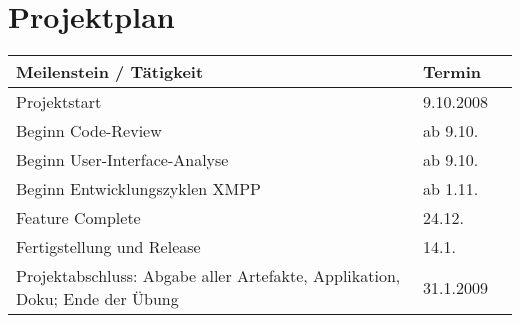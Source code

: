 

\section{Projektplan}
\begin{tabular}{ | p{11.2cm} | p{4cm} | l | }
\hline
\textbf{Meilenstein / Tätigkeit} & \textbf{Termin} \\
\hline
Projektstart & 9.10.2008\\
\hline
Beginn Code-Review & ab 9.10.\\
\hline
Beginn User-Interface-Analyse & ab 9.10.\\
\hline
Beginn Entwicklungszyklen XMPP & ab 1.11.\\
\hline
Feature Complete & 24.12. \\
\hline
Fertigstellung und Release & 14.1. \\
\hline
Projektabschluss: Abgabe aller Artefakte, Applikation, Doku; Ende der Übung & 31.1.2009\\
\hline
\end{tabular}



